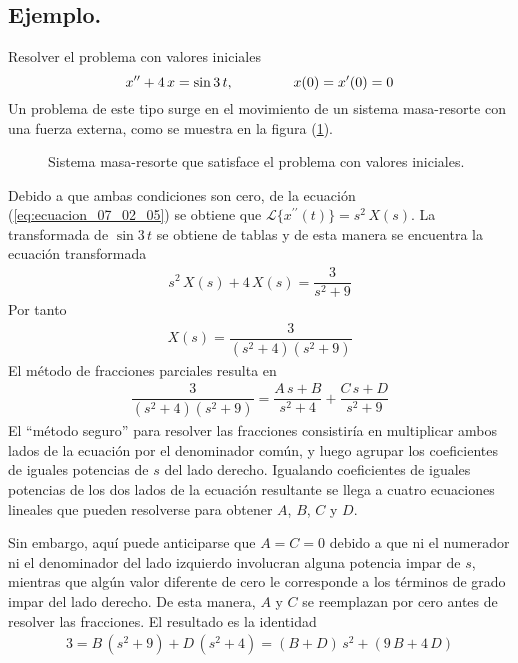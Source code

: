 \subsection*{Ejemplo.}
Resolver el problema con valores iniciales
\[ x^{\prime \prime} + 4 \, x =  \sin 3 \, t, \hspace{1.5cm} x(0) = x^{\prime}(0) = 0 \]
Un problema de este tipo surge en el movimiento de un sistema masa-resorte con una fuerza externa, como se muestra en la figura (\ref{fig:figura_07_02_02}).
\begin{figure}[!ht]
    \centering
    
    \caption{Sistema masa-resorte que satisface el problema con valores iniciales.}
    \label{fig:figura_07_02_02}
\end{figure}
Debido a que ambas condiciones son cero, de la ecuación (\ref{eq:ecuacion_07_02_05}) se obtiene que $\mathscr{L} \{x^{\prime \prime} (t) \} = s^{2} \, X(s) $. La transformada de $\sin 3 \, t$ se obtiene de tablas y de esta manera se encuentra la ecuación transformada
\begin{align*}
s^{2} \, X(s) + 4 \, X(s) = \dfrac{3}{s^{2} + 9}
\end{align*}
Por tanto
\begin{align*}
X(s) = \dfrac{3}{(s^{2} + 4)(s^{2} + 9)}
\end{align*}
El método de fracciones parciales resulta en
\begin{align*}
\dfrac{3}{(s^{2} + 4)(s^{2} + 9)} = \dfrac{A \, s + B}{s^{2} + 4} + \dfrac{C \, s +D}{s^{2} + 9}
\end{align*}
El \enquote{método seguro} para resolver las fracciones consistiría en multiplicar ambos lados de la ecuación por el denominador común, y luego agrupar los coeficientes de iguales potencias de $s$ del lado derecho. Igualando coeficientes de iguales potencias de los dos lados de la ecuación resultante se llega a cuatro ecuaciones lineales que pueden resolverse para obtener $A$, $B$, $C$ y $D$.
\par
Sin embargo, aquí puede anticiparse que $A = C = 0$ debido a que ni el numerador ni el denominador del lado izquierdo involucran alguna potencia impar de $s$, mientras que algún valor diferente de cero le corresponde a los términos de grado impar del lado derecho. De esta manera, $A$ y $C$ se reemplazan por cero antes de resolver las fracciones. El resultado es la identidad
\begin{align*}
3 = B \, (s^{2} + 9) + D \, (s^{2} + 4) =  (B + D) \, s^{2} + (9 \, B + 4 \, D)
\end{align*}
